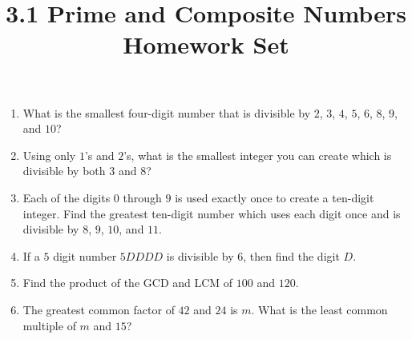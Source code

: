 \documentclass{article}
\title{3.1 Prime and Composite Numbers Homework Set}
\date{}
\author{}
\begin{document}
\maketitle
\begin{enumerate}
    \item What is the smallest four-digit number that is divisible by $2$, $3$, $4$, $5$, $6$, $8$, $9$, and $10$?
        \vspace{3cm}
    \item Using only $1$'s and $2$'s, what is the smallest integer you can create which is divisible by both $3$ and $8$?
        \vspace{3cm}
    \item Each of the digits $0$ through $9$ is used exactly once to create a ten-digit integer.
        Find the greatest ten-digit number which uses each digit once and is divisible by $8$, $9$, $10$, and $11$.
        \vspace{3cm}
    \item If a $5$ digit number $5DDDD$ is divisible by $6$, then find the digit $D$.
        \vspace{3cm}
    \item Find the product of the GCD and LCM of $100$ and $120$.
        \vspace{3cm}
    \item The greatest common factor of $42$ and $24$ is $m$.
        What is the least common multiple of $m$ and $15$?
        \vspace{3cm}
\end{enumerate}
\end{document}
